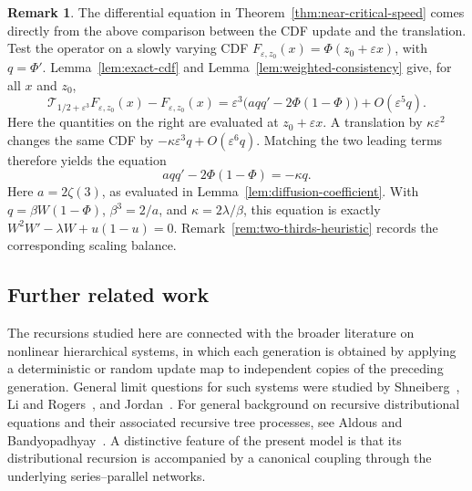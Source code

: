 \documentclass[12pt]{amsart}
\numberwithin{equation}{section}
\theoremstyle{plain}
\theoremstyle{definition}
\newtheorem{remark}[theorem]{Remark}
\begin{document}
\begin{remark}
    The differential equation in Theorem~\ref{thm:near-critical-speed} comes
directly from the above comparison between the CDF update and the translation. Test the operator on a slowly varying CDF
$F_{\varepsilon,z_0}(x)=\Phi(z_0+\varepsilon x)$, with
$q=\Phi'$.  Lemma~\ref{lem:exact-cdf} and
Lemma~\ref{lem:weighted-consistency} give, for all $x$ and $z_0$,
\[
 \mathcal T_{1/2+\varepsilon^3}F_{\varepsilon,z_0}(x)
 -F_{\varepsilon,z_0}(x)
 =\varepsilon^3\bigl(a q q'-2\Phi(1-\Phi)\bigr)
  +O(\varepsilon^5q).
\]
Here the quantities on the right are evaluated at
$z_0+\varepsilon x$.
A translation by $\kappa\varepsilon^2$ changes the same CDF by
$-\kappa\varepsilon^3q+O(\varepsilon^6q)$.  Matching the two leading terms
therefore yields the  equation
\[
 a q q'-2\Phi(1-\Phi)=-\kappa q.
\]
Here $a=2\zeta(3)$, as evaluated in Lemma~\ref{lem:diffusion-coefficient}. With $q=\beta W(1-\Phi)$, $\beta^3=2/a$, and
$\kappa=2\lambda/\beta$, this equation is exactly
$W^2W'-\lambda W+u(1-u)=0$.   Remark~\ref{rem:two-thirds-heuristic} records the corresponding
scaling balance.

\end{remark}



\subsection{Further related work}

The recursions studied here are connected with the broader literature on
nonlinear hierarchical systems, in which each generation is obtained by
applying a deterministic or random update map to independent copies of the
preceding generation.  General limit questions for such systems were studied
by Shneiberg~\cite{Shneiberg1986}, Li and Rogers~\cite{LiRogers1999}, and
Jordan~\cite{Jordan2002}.  For general background on recursive distributional
equations and their associated recursive tree processes, see Aldous and
Bandyopadhyay~\cite{AldousBandyopadhyay2005}.  A distinctive feature of the
present model is that its distributional recursion is accompanied by a
canonical coupling through the underlying series--parallel networks.
\end{document}
